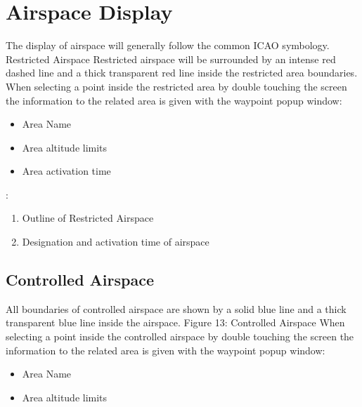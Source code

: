 \documentclass[letterpaper,10pt,english]{sphinxmanual}
\begin{document}
\chapter{Airspace Display}
\label{\detokenize{03-reference/airspace_display:airspace-display}}\label{\detokenize{03-reference/airspace_display::doc}}
\sphinxAtStartPar
The display of airspace will generally follow the common ICAO symbology.
Restricted Airspace
Restricted airspace will be surrounded by an intense red dashed line and a thick transparent red line inside the restricted area boundaries.
When selecting a point inside the restricted area by double touching the screen the information to the related area is given with the waypoint pop\sphinxhyphen{}up window:
\begin{itemize}
\item {} 
\sphinxAtStartPar
Area Name

\item {} 
\sphinxAtStartPar
Area altitude limits

\item {} 
\sphinxAtStartPar
Area activation time

\end{itemize}

\begin{figure}[htbp]
\centering

\noindent{}
\end{figure}

\sphinxAtStartPar
{}:
\begin{enumerate}
%
\item {} 
\sphinxAtStartPar
Outline of Restricted Airspace

\item {} 
\sphinxAtStartPar
Designation and activation time of airspace

\end{enumerate}


\section{Controlled Airspace}
\label{\detokenize{03-reference/airspace_display:controlled-airspace}}
\sphinxAtStartPar
All boundaries of controlled airspace are shown by a solid blue line and a thick transparent blue line inside the airspace. Figure 13:  Controlled Airspace
When selecting a point inside the controlled airspace by double touching the screen the information to the related area is given with the waypoint pop\sphinxhyphen{}up window:
\begin{itemize}
\item {} 
\sphinxAtStartPar
Area Name

\item {} 
\sphinxAtStartPar
Area altitude limits

\end{itemize}
\end{document}
